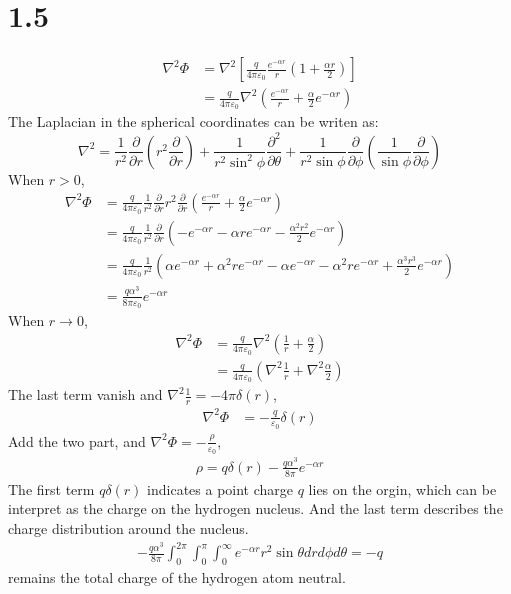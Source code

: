 \documentclass{article}
\begin{document}
  \section*{1.5}
  \begin{align*}
    \nabla^2\Phi&=\nabla^2[\frac{q}{4\pi\varepsilon_0}\frac{e^{-\alpha r}}{r}(1+\frac{\alpha r}{2})]\\
    &=\frac{q}{4\pi\varepsilon_0}\nabla^2(\frac{e^{-\alpha r}}{r}+\frac{\alpha}{2}e^{-\alpha r})
  \end{align*}
  The Laplacian in the spherical coordinates can be writen as:
  \[ \nabla^2=\frac{1}{r^2}\frac{\partial}{\partial r}(r^2\frac{\partial}{\partial r})+\frac{1}{r^2\sin^2\phi}\frac{\partial^2}{\partial \theta}
  +\frac{1}{r^2\sin\phi}\frac{\partial}{\partial\phi}(\frac{1}{\sin\phi}\frac{\partial}{\partial\phi})
  \]
  When $r>0$,
  \begin{align*}
      \nabla^2\Phi&=\frac{q}{4\pi\varepsilon_0}\frac{1}{r^2}\frac{\partial}{\partial r}r^2\frac{\partial}{\partial r}(\frac{e^{-\alpha r}}{r}
      +\frac{\alpha}{2}e^{-\alpha r})\\
      &=\frac{q}{4\pi\varepsilon_0}\frac{1}{r^2}\frac{\partial}{\partial r}(-e^{-\alpha r}-\alpha re^{-\alpha r}-\frac{\alpha^2 r^2}{2}e^{-\alpha r})\\
      &=\frac{q}{4\pi\varepsilon_0}\frac{1}{r^2}(\alpha e^{-\alpha r}+\alpha^2 re^{-\alpha r}-\alpha e^{-\alpha r}-\alpha^2 re^{-\alpha r}+\frac{\alpha^3 r^3}{2}e^{-\alpha r})\\ 
      &=\frac{q\alpha^3}{8\pi\varepsilon_0}e^{-\alpha r}
  \end{align*}
When $r\rightarrow 0$,
\begin{align*}
    \nabla^2\Phi&=\frac{q}{4\pi\varepsilon_0}\nabla^2(\frac{1}{r}+\frac{\alpha}{2})\\
    &=\frac{q}{4\pi\varepsilon_0}(\nabla^2\frac{1}{r}+\nabla^2\frac{\alpha}{2})
\end{align*}
The last term vanish and $\nabla^2 \frac{1}{r}=-4\pi\delta(r)$,
\begin{align*}
    \nabla^2\Phi&=-\frac{q}{\varepsilon_0}\delta(r)
\end{align*}
Add the two part, and $\nabla^2\Phi=-\frac{\rho}{\varepsilon_0}$,
\begin{align*}
    \rho=q\delta(r)-\frac{q\alpha^3}{8\pi}e^{-\alpha r}
\end{align*}
The first term $q\delta(r)$ indicates a point charge $q$ lies on the orgin, which can be interpret as the charge on the hydrogen nucleus.
And the last term describes the charge distribution around the nucleus.
\begin{align*}
  -\frac{q\alpha^3}{8\pi}\int_0^{2\pi}\int_0^\pi\int_0^\infty e^{-\alpha r}r^2\sin\theta drd\phi d\theta=-q
\end{align*}
remains the total charge of the hydrogen atom neutral.
\pagebreak
\end{document}
